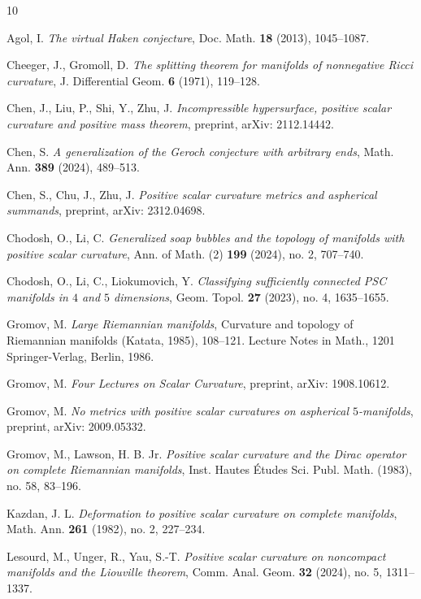 \documentclass[11pt, reqno]{amsart}
\numberwithin{equation}{section}
\theoremstyle{definition}
\begin{document}
\begin{thebibliography}{10}

Agol, I. {\em The virtual Haken conjecture}, Doc. Math. {\bf 18} (2013), 1045--1087.

 Cheeger, J., Gromoll, D. {\em The splitting theorem for manifolds of nonnegative Ricci curvature}, J. Differential Geom. {\bf 6} (1971), 119--128.

 Chen, J., Liu, P., Shi, Y., Zhu, J. {\em Incompressible hypersurface, positive scalar curvature and positive mass theorem}, preprint, arXiv: 2112.14442.

 Chen, S. {\em A generalization of the Geroch conjecture with arbitrary ends}, Math. Ann. {\bf 389} (2024), 489--513.

 Chen, S., Chu, J., Zhu, J. {\em Positive scalar curvature metrics and aspherical summands}, preprint, arXiv: 2312.04698.

 Chodosh, O., Li, C. {\em Generalized soap bubbles and the topology of manifolds with positive scalar curvature}, Ann. of Math. (2) {\bf 199} (2024), no. 2, 707--740.

 Chodosh, O., Li, C., Liokumovich, Y. {\em Classifying sufficiently connected PSC manifolds in $4$ and $5$ dimensions}, Geom. Topol. {\bf 27} (2023), no. 4, 1635--1655.

 Gromov, M. {\em Large Riemannian manifolds}, Curvature and topology of Riemannian manifolds (Katata, 1985), 108--121. Lecture Notes in Math., 1201 Springer-Verlag, Berlin, 1986.

 Gromov, M. {\em Four Lectures on Scalar Curvature}, preprint, arXiv: 1908.10612.

 Gromov, M. {\em No metrics with positive scalar curvatures on aspherical $5$-manifolds}, preprint, arXiv: 2009.05332.

 Gromov, M., Lawson, H. B. Jr. {\em Positive scalar curvature and the Dirac operator on complete Riemannian manifolds}, Inst. Hautes \'{E}tudes Sci. Publ. Math. (1983), no. 58, 83--196.

 Kazdan, J. L. {\em Deformation to positive scalar curvature on complete manifolds}, Math. Ann. {\bf 261} (1982), no. 2, 227--234.

 Lesourd, M., Unger, R., Yau, S.-T. {\em Positive scalar curvature on noncompact manifolds and the Liouville theorem}, Comm. Anal. Geom. {\bf 32} (2024), no. 5, 1311--1337.


\end{thebibliography}
\end{document}

